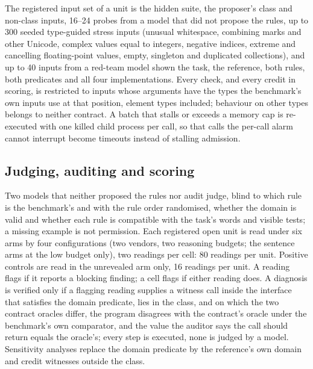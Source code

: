The registered input set of a unit is the hidden suite, the proposer's class and non-class inputs, 16--24 probes
from a model that did not propose the rules, up to 300 seeded type-guided stress inputs (unusual whitespace,
combining marks and other Unicode, complex values equal to integers, negative indices, extreme and cancelling
floating-point values, empty, singleton and duplicated collections), and up to 40 inputs from a red-team model shown
the task, the reference, both rules, both predicates and all four implementations. Every check, and every credit in
scoring, is restricted to inputs whose arguments have the types the benchmark's own inputs use at that position,
element types included; behaviour on other types belongs to neither contract. A batch that stalls or exceeds a
memory cap is re-executed with one killed child process per call, so that calls the per-call alarm cannot interrupt
become timeouts instead of stalling admission.

\subsection{Judging, auditing and scoring}

Two models that neither proposed the rules nor audit judge, blind to which rule is the benchmark's and with the rule
order randomised, whether the domain is valid and whether each rule is compatible with the task's words and visible
tests; a missing example is not permission. Each registered open unit is read under six arms by four configurations
(two vendors, two reasoning budgets; the sentence arms at the low budget only), two readings per cell: 80 readings per
unit. Positive controls are read in the unrevealed arm only, 16 readings per unit. A reading flags if it reports a
blocking finding; a cell flags if either reading does. A diagnosis is verified only if a flagging reading supplies a
witness call inside the interface that satisfies the domain predicate, lies in the class, and on which the two
contract oracles differ, the program disagrees with the contract's oracle under the benchmark's own comparator,
and the value the auditor says the call should return equals the oracle's; every step is executed, none is judged by
a model. Sensitivity analyses replace the domain predicate by the reference's own domain
and credit witnesses outside the class.

